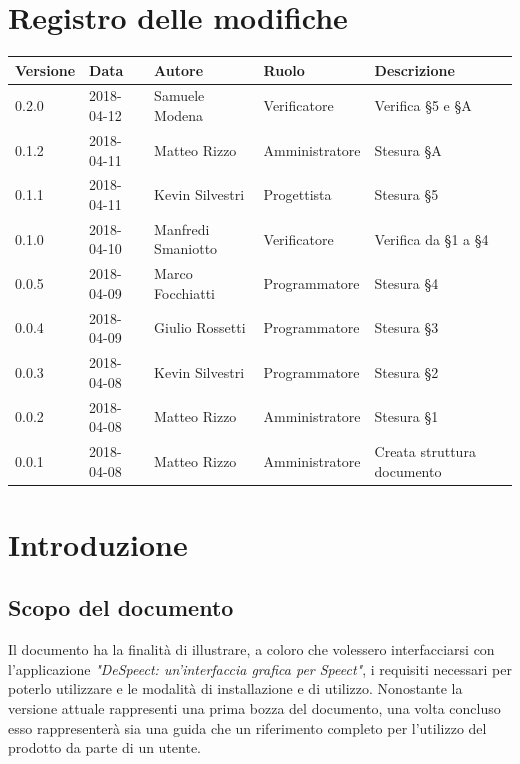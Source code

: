 \documentclass[openany,12pt,a4paper]{report}
\begin{document}
	\chapter*{Registro delle modifiche}
	\setlength\LTleft{-22mm}
	\begin{longtable}{|p{20mm}|p{20mm}|p{40mm}|p{30mm}|p{50mm}|}
		\hline
		\textbf{Versione} & \textbf{Data} & \textbf{Autore} & \textbf{Ruolo} & \textbf{Descrizione} \\
		
		\hline 0.2.0 & 2018-04-12 & Samuele Modena & Verificatore & Verifica §5 e §A\\
		\hline 0.1.2 & 2018-04-11 & Matteo Rizzo & Amministratore & Stesura §A \\	
		\hline 0.1.1 & 2018-04-11 & Kevin Silvestri & Progettista & Stesura §5 \\
		\hline 0.1.0 & 2018-04-10 & Manfredi Smaniotto & Verificatore & Verifica da §1 a §4 \\
		\hline 0.0.5 & 2018-04-09 & Marco Focchiatti & Programmatore & Stesura §4 \\	
		\hline 0.0.4 & 2018-04-09 & Giulio Rossetti & Programmatore & Stesura §3 \\
		\hline 0.0.3 & 2018-04-08 & Kevin Silvestri & Programmatore & Stesura §2 \\
		\hline 0.0.2 & 2018-04-08 & Matteo Rizzo & Amministratore & Stesura §1 \\
		\hline 0.0.1 & 2018-04-08 & Matteo Rizzo & Amministratore & Creata struttura documento \\
		\hline
		
	\end{longtable}
	
	\tableofcontents
	
	
	\chapter{Introduzione}
	
	\section{Scopo del documento}
	
	Il documento ha la finalità di illustrare, a coloro che volessero interfacciarsi con l’applicazione
	\textit{"DeSpeect: un'interfaccia grafica per Speect"}, i requisiti necessari per poterlo utilizzare e le modalità di installazione e di utilizzo. 
	Nonostante la versione attuale rappresenti una prima bozza del documento, una volta concluso esso rappresenterà sia una guida che un riferimento completo per l’utilizzo del prodotto da parte di un utente.
	
\end{document}
